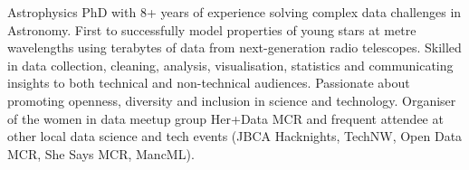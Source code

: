  \vspace{-6pt}

\begin{cvpubs}
  \cvpub
    {
      \begin{cvlist}
  \item {Astrophysics PhD with 8+ years of experience solving complex data challenges in Astronomy. First to successfully model properties of young stars at metre wavelengths using terabytes of data from next-generation radio telescopes. Skilled in data collection, cleaning, analysis, visualisation, statistics and communicating insights to both technical and non-technical audiences. Passionate about promoting openness, diversity and inclusion in science and technology. Organiser of the women in data meetup group Her+Data MCR and frequent attendee at other local data science and tech events (JBCA Hacknights, TechNW, Open Data MCR, She Says MCR, MancML).}
      \end{cvlist}
    }
\vspace{-11pt}
\end{cvpubs}


